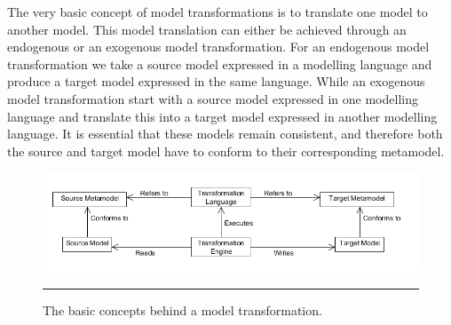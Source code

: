 The very basic concept of model transformations is to translate one model to
another model. This model translation can either be achieved through an
endogenous or an exogenous model transformation. For an endogenous model
transformation we take a source model expressed in a modelling language and
produce a target model expressed in the same language. While an exogenous model
transformation start with a source model expressed in one modelling language and
translate this into a target model expressed in another modelling language. It
is essential that these models remain consistent, and therefore both the source
and target model have to conform to their corresponding metamodel.

\begin{figure}[H]
  \centering
    \includegraphics[scale=0.5]{./Figures/BasicTransformation.png}
    \rule{35em}{0.5pt}
  \caption[Basic Model Transformation]
  				{The basic concepts behind a model
  transformation.}
  \label{fig:BasicTransformation}
\end{figure}

